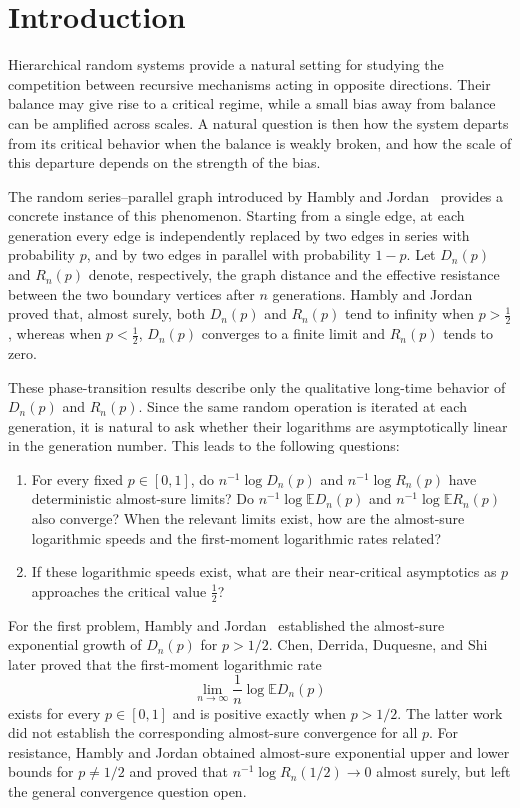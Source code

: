 \documentclass[12pt,preprint]{amsart}
\numberwithin{equation}{section}
\theoremstyle{plain}
\theoremstyle{definition}
\newcommand{\E}{\mathbb E}
\begin{document}
\section{Introduction}
\label{sec:introduction}

Hierarchical random systems provide a natural setting for studying the
competition between recursive mechanisms acting in opposite directions.
Their balance may give rise to a critical regime, while a small bias away
from balance can be amplified across scales.  A natural question is then how
the system departs from its critical behavior when the balance is weakly
broken, and how the scale of this departure depends on the strength of the
bias.

The random series--parallel graph introduced by Hambly and
Jordan~\cite{HamblyJordan2004} provides a concrete instance of this
phenomenon.  Starting from a single edge, at each generation every edge is
independently replaced by two edges in series with probability $p$, and by
two edges in parallel with probability $1-p$.  Let $D_n(p)$ and $R_n(p)$
denote, respectively, the graph distance and the effective resistance
between the two boundary vertices after $n$ generations.  Hambly and
Jordan~\cite[Theorem~2.1 and Lemma~3.1]{HamblyJordan2004}
proved that, almost surely, both $D_n(p)$ and $R_n(p)$ tend to infinity when
$p>\frac12$, whereas when $p<\frac12$, $D_n(p)$ converges to a finite limit
and $R_n(p)$ tends to zero.

These phase-transition results describe only the qualitative long-time
behavior of $D_n(p)$ and $R_n(p)$.  Since the same random operation is
iterated at each generation, it is natural to ask whether their logarithms
are asymptotically linear in the generation number.  This leads to the
following questions:
\begin{enumerate}
\item For every fixed $p\in[0,1]$, do $n^{-1}\log D_n(p)$ and
$n^{-1}\log R_n(p)$ have deterministic almost-sure limits?  Do
$n^{-1}\log\E D_n(p)$ and $n^{-1}\log\E R_n(p)$ also converge?  When the
relevant limits exist, how are the almost-sure logarithmic speeds and the
first-moment logarithmic rates related?
\item If these logarithmic speeds exist, what are their near-critical
asymptotics as $p$ approaches the critical value $\frac12$?
\end{enumerate}

For the first problem, Hambly and Jordan~\cite[Lemma 3.1(a)]{HamblyJordan2004} established
the almost-sure exponential growth of $D_n(p)$ for $p>1/2$.  Chen, Derrida,
Duquesne, and
Shi~\cite[equation~(1.2)]{ChenDerridaDuquesneShi2026} later proved that the
first-moment logarithmic rate
\[
 \lim_{n\to\infty}\frac1n\log\E D_n(p)
\]
exists for every $p\in[0,1]$ and is positive exactly when $p>1/2$.  The latter
work did not establish the corresponding almost-sure convergence for all
$p$.  For resistance, Hambly and Jordan obtained almost-sure exponential
upper and lower bounds for $p\ne1/2$ and proved that
$n^{-1}\log R_n(1/2)\to0$ almost surely,
but left the general convergence question open.
\end{document}
